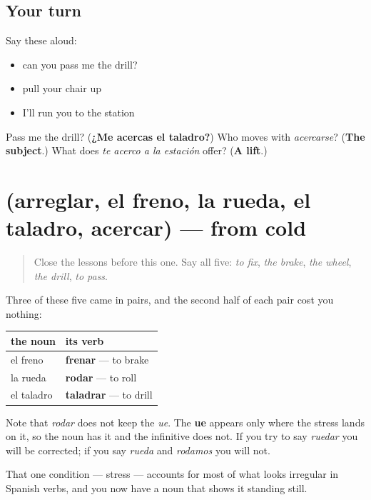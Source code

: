 \subsection*{Your turn}
Say these aloud:

\begin{itemize}
\raggedright
  \item can you pass me the drill?
  \item pull your chair up
  \item I'll run you to the station
\end{itemize}

\begin{tcolorbox}[breakable,colback=teal!4,colframe=teal!35!black,title={Before you move on}]
Pass me the drill? (\textbf{¿Me acercas el taladro?}) Who moves with \emph{acercarse}? (\textbf{The subject}.) What does \emph{te acerco a la estación} offer? (\textbf{A lift}.)
\end{tcolorbox}
\section[(arreglar, el freno, la rueda, el …]{(arreglar, el freno, la rueda, el taladro, acercar) — from cold}

\label{lesson:ES-R449-repaso-taller}



\begin{quote}
Close the lessons before this one. Say all five: \emph{to fix}, \emph{the brake}, \emph{the wheel}, \emph{the drill}, \emph{to pass}.
\end{quote}

\begin{grammarlens}[title={Grammar Lens: each noun brought a verb with it}]
Three of these five came in pairs, and the second half of each pair cost you nothing:

\noindent
\begin{tabularx}{\linewidth}{@{}>{\raggedright\arraybackslash}X>{\raggedright\arraybackslash}X@{}}
\toprule
\textbf{the noun} & \textbf{its verb} \\
\midrule
el freno & \textbf{frenar} — to brake \\
la rueda & \textbf{rodar} — to roll \\
el taladro & \textbf{taladrar} — to drill \\
\bottomrule
\end{tabularx}

Note that \emph{rodar} does not keep the \emph{ue}. The \textbf{ue} appears only where the stress lands on it, so the noun has it and the infinitive does not. If you try to say \emph{ruedar} you will be corrected; if you say \emph{rueda} and \emph{rodamos} you will not.

That one condition — stress — accounts for most of what looks irregular in Spanish verbs, and you now have a noun that shows it standing still.
\end{grammarlens}

